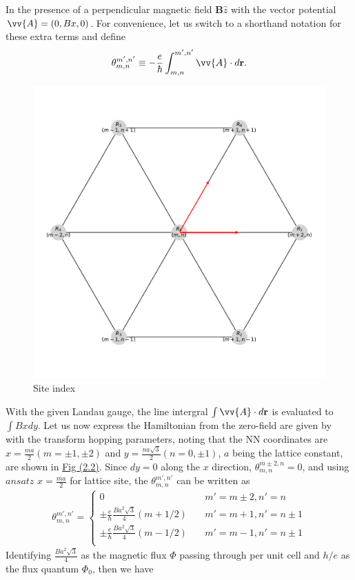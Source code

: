 \documentclass{report}
\newcommand{\f}[2]{\dfrac{#1}{#2}}
\begin{document}
In the presence of a perpendicular magnetic field $\mathbf{B} \hat{z}$ with the vector potential $\vv{A} = (0, Bx, 0)$. For convenience, let us switch to a shorthand notation for these extra terms and define
\begin{gather}
	\theta_{m,n}^{m',n'} \equiv - \f{e}{\hbar} \int_{m,n}^{m',n'} \vv{A} \cdot d\mathbf{r}.
\end{gather}
\begin{figure}[H]
	\centering
	\includegraphics[width=0.5\linewidth,height=0.5\linewidth]{pic/siteindice.pdf}
	\caption{\label{fig:site index} Site index}
\end{figure}
With the given Landau gauge, the line intergral $\int \vv{A} \cdot d\mathbf{r}$ is evaluated to $\int Bx dy$. Let us now express the Hamiltonian from the zero-field are given by \cite{PhysRevB.88.085433} with the transform hopping parameters, noting that the NN coordinates are $x = \frac{ma}{2}(m = \pm 1, \pm 2)$ and $y = \frac{na\sqrt{3}}{2}(n = 0,\pm 1)$, $a$ being the lattice constant, are shown in \hyperref[fig:site index]{Fig (2.2)}. Since $dy = 0$ along the $x$ direction, $\theta_{m,n}^{m \pm 2, n} = 0$, and using $ansatz$ $x = \frac{ma}{2}$ for lattice site, the $\theta_{m,n}^{m',n'}$ can be written as
\begin{gather}
	\theta_{m,n}^{m',n'} =
	\begin{cases}
		0                                                         & \quad m' = m \pm 2, n' = n     \\
		\pm \frac{e}{\hbar} \frac{B a^{2} \sqrt{3}}{4} (m + 1 /2) & \quad m' = m + 1, n' = n \pm 1 \\
		\pm \frac{e}{\hbar} \frac{B a^{2} \sqrt{3}}{4} (m - 1 /2) & \quad m' = m - 1, n' = n \pm 1 \\
	\end{cases}
\end{gather}
Identifying $\frac{B a^{2} \sqrt{3}}{4}$ as the magnetic flux $\Phi$ passing through per unit cell and $h / e$ as the flux quantum $\Phi_{0}$, then we have
\end{document}
